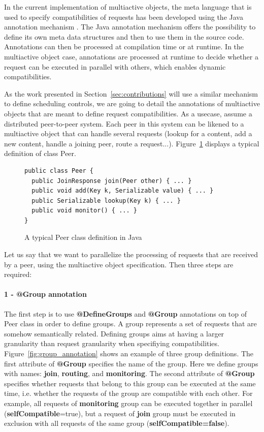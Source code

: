 \documentclass[11pt]{report}
\begin{document}
In the current implementation of multiactive objects, the meta language that is used to specify compatibilities of requests has been developed using the Java annotation mechanism \cite{ref:annotations}. The Java annotation mechanism offers the possibility to define its own meta data structures and then to use them in the source code. Annotations can then be processed at compilation time or at runtime.
In the multiactive object case, annotations are processed at runtime to decide whether a request can be executed in parallel with others, which enables dynamic compatibilities.

As the work presented in Section~\ref{sec:contributions} will use a similar mechanism to define scheduling controls, we are going to detail the annotations of multiactive objects that are meant to define request compatibilities. 
As a usecase, assume a distributed peer-to-peer system. Each peer in this system can be likened to a multiactive object that can handle several requests (lookup for a content, add a new content, handle a joining peer, route a request...). Figure~\ref{fig:regular_peer_class} displays a typical definition of class Peer.

\begin{figure}[!ht]
	\lstset{language=java, numbers=left, numberstyle=\tiny, stepnumber=1, numbersep=5pt, basicstyle=\footnotesize}
	\begin{lstlisting}[frame=single]
public class Peer {
  public JoinResponse join(Peer other) { ... }
  public void add(Key k, Serializable value) { ... }
  public Serializable lookup(Key k) { ... }
  public void monitor() { ... }
}
 	\end{lstlisting}
\caption{A typical Peer class definition in Java}
\label{fig:regular_peer_class}
\end{figure}

Let us say that we want to parallelize the processing of requests that are received by a peer, using the multiactive object specification. Then three steps are required: 

\paragraph{1 - \textbf{@Group} annotation}
The first step is to use \textbf{@DefineGroups} and \textbf{@Group} annotations on top of Peer class in order to define groups. A group represents a set of requests that are somehow semantically related. Defining groups aims at having a larger granularity than request granularity when specifiying compatibilities. Figure~\ref{fig:group_annotation} shows an example of three group definitions. The first attribute of \textbf{@Group} specifies the name of the group. Here we define groups with names: \textbf{join}, \textbf{routing}, and \textbf{monitoring}. The second attribute of \textbf{@Group} specifies whether requests that belong to this group can be executed at the same time, i.e. whether the requests of the group are compatible with each other. For example, all requests of \textbf{monitoring} group can be executed together in parallel (\textbf{selfCompatible}=true), but a request of \textbf{join} group must be executed in exclusion with all requests of the same group (\textbf{selfCompatible=false}).
\end{document}
